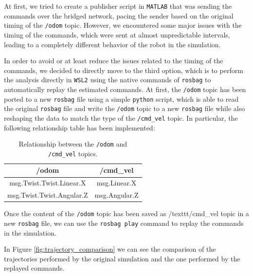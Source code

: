 At first, we tried to create a publisher script in \texttt{MATLAB} that was sending the commands over the bridged network, pacing the sender based on the original timing of the \texttt{/odom} topic.
However, we encountered some major issues with the timing of the commands, which were sent at almost unpredictable intervals, leading to a completely different behavior of the robot in the simulation.

In order to avoid or at least reduce the issues related to the timing of the commands, we decided to directly move to the third option, which is to perform the analysis directly in \texttt{WSL2} using the native commands of \texttt{rosbag} to automatically replay the estimated commands.
At first, the \texttt{/odom} topic has been ported to a new \texttt{rosbag} file using a simple \texttt{python} script, which is able to read the original \texttt{rosbag} file and write the \texttt{/odom} topic to a new \texttt{rosbag} file while also reshaping the data to match the type of the \texttt{/cmd\_vel} topic.
In particular, the following relationship table has been implemented:

\begin{table}[H]
    \centering
    \begin{tabular}{c|c}
        \textbf{/odom}            & \textbf{/cmd\_vel} \\
        \hline
        msg.Twist.Twist.Linear.X  & msg.Linear.X       \\
        msg.Twist.Twist.Angular.Z & msg.Angular.Z      \\
        \hline
    \end{tabular}
    \caption{Relationship between the \texttt{/odom} and \texttt{/cmd\_vel} topics.}
    \label{tab:rosbag_relationship}
\end{table}

Once the content of the \texttt{/odom} topic has been saved as /texttt{/cmd\_vel} topic in a new \texttt{rosbag} file, we can use the \texttt{rosbag play} command to replay the commands in the simulation.

In Figure \ref{fig:trajectory_comparison} we can see the comparison of the trajectories performed by the original simulation and the one performed by the replayed commands.

